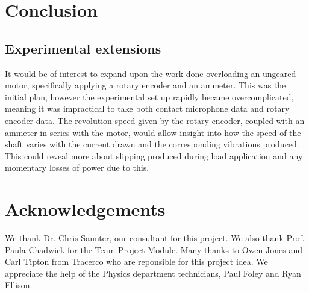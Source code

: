 \section{Conclusion}
\label{sec:conclusion}


\subsection{Experimental extensions }

It would be of interest to expand upon the work done overloading an ungeared motor, specifically applying a rotary encoder and an ammeter. This was the initial plan, however the experimental set up rapidly became overcomplicated, meaning it was impractical to take both contact microphone data and rotary encoder data. The revolution speed given by the rotary encoder, coupled with an ammeter in series with the motor, would allow insight into how the speed of the shaft varies with the current drawn and the corresponding vibrations produced. This could reveal more about slipping produced during load application and any momentary losses of power due to this. 






\section*{Acknowledgements}

\small We thank Dr. Chris Saunter, our consultant for this project. We also thank Prof. Paula Chadwick for the Team Project Module. Many thanks to Owen Jones and Carl Tipton from Tracerco who are reponsible for this project idea. We appreciate the help of the Physics department technicians, Paul Foley and Ryan Ellison.




















































